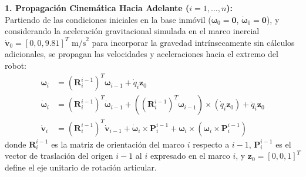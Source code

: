 \documentclass[12pt]{article}
\begin{document}
\textbf{1. Propagación Cinemática Hacia Adelante ($i = 1, \dots, n$):} \\
Partiendo de las condiciones iniciales en la base inmóvil ($\bm{\omega}_0 = \bm{0}$, $\dot{\bm{\omega}}_0 = \bm{0}$), y considerando la aceleración gravitacional simulada en el marco inercial $\dot{\bm{v}}_0 = [0, 0, 9.81]^T\text{ m/s}^2$ para incorporar la gravedad intrínsecamente sin cálculos adicionales, se propagan las velocidades y aceleraciones hacia el extremo del robot:
\begin{align}
\bm{\omega}_i &= (\bm{R}_i^{i-1})^T \bm{\omega}_{i-1} + \dot{q}_i \bm{z}_0 \label{eq:rnea_omega} \\
\dot{\bm{\omega}}_i &= (\bm{R}_i^{i-1})^T \dot{\bm{\omega}}_{i-1} + \left((\bm{R}_i^{i-1})^T \bm{\omega}_{i-1}\right) \times (\dot{q}_i \bm{z}_0) + \ddot{q}_i \bm{z}_0 \label{eq:rnea_domega} \\
\dot{\bm{v}}_i &= (\bm{R}_i^{i-1})^T \dot{\bm{v}}_{i-1} + \dot{\bm{\omega}}_i \times \bm{P}_i^{i-1} + \bm{\omega}_i \times \left(\bm{\omega}_i \times \bm{P}_i^{i-1}\right) \label{eq:rnea_dv}
\end{align}
donde $\bm{R}_i^{i-1}$ es la matriz de orientación del marco $i$ respecto a $i-1$, $\bm{P}_i^{i-1}$ es el vector de traslación del origen $i-1$ al $i$ expresado en el marco $i$, y $\bm{z}_0 = [0, 0, 1]^T$ define el eje unitario de rotación articular.
\end{document}

